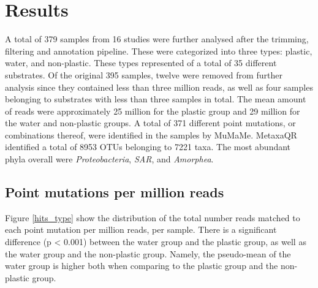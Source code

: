 \chapter{Results}

A total of 379 samples from 16 studies were further analysed after the trimming, filtering and annotation pipeline. These were categorized into three types: plastic, water, and non-plastic. These types represented of a total of 35 different substrates. 
Of the original 395 samples, twelve were removed from further analysis since they contained less than three million reads, as well as four samples belonging to substrates with less than three samples in total.
The mean amount of reads were approximately 25 million for the plastic group and 29 million for the water and non-plastic groups.
A total of 371 different point mutations, or combinations thereof, were identified in the samples by MuMaMe. MetaxaQR identified a total of 8953 OTUs belonging to 7221 taxa. The most abundant phyla overall were \emph{Proteobacteria}, \emph{SAR}, and \emph{Amorphea}. 


\section{Point mutations per million reads}
Figure \ref{hits_type} show the distribution of the total number reads matched to each point mutation per million reads, per sample. There is a significant difference (p < 0.001) between the water group and the plastic group, as well as the water group and the non-plastic group. Namely, the pseudo-mean of the water group is higher both when comparing to the plastic group and the non-plastic group.

